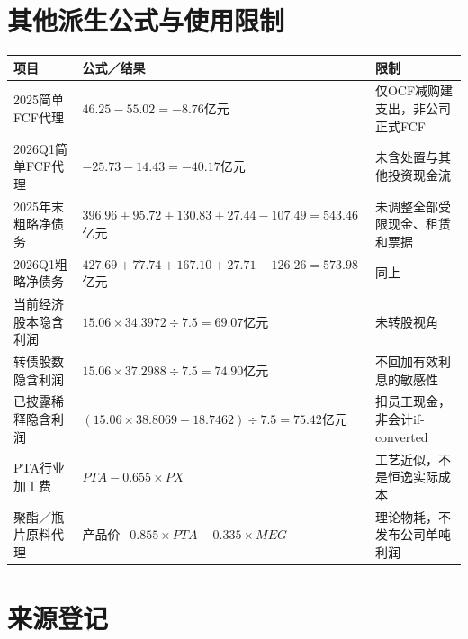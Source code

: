 \section{其他派生公式与使用限制}

\begin{exhibitbox}[财务与市场派生]
\small
\noindent\begin{tabularx}{\textwidth}{L{3.4cm}L{5.1cm}X}
\toprule
\textbf{项目} & \textbf{公式／结果} & \textbf{限制} \\
\midrule
2025简单FCF代理 & $46.25-55.02=-8.76$亿元 & 仅OCF减购建支出，非公司正式FCF \\
2026Q1简单FCF代理 & $-25.73-14.43=-40.17$亿元 & 未含处置与其他投资现金流 \\
2025年末粗略净债务 & $396.96+95.72+130.83+27.44-107.49=543.46$亿元 & 未调整全部受限现金、租赁和票据 \\
2026Q1粗略净债务 & $427.69+77.74+167.10+27.71-126.26=573.98$亿元 & 同上 \\
当前经济股本隐含利润 & $15.06\times34.3972\div7.5=69.07$亿元 & 未转股视角 \\
转债股数隐含利润 & $15.06\times37.2988\div7.5=74.90$亿元 & 不回加有效利息的敏感性 \\
已披露稀释隐含利润 & $(15.06\times38.8069-18.7462)\div7.5=75.42$亿元 & 扣员工现金，非会计if-converted \\
PTA行业加工费 & $PTA-0.655\times PX$ & 工艺近似，不是恒逸实际成本 \\
聚酯／瓶片原料代理 & 产品价$-0.855\times PTA-0.335\times MEG$ & 理论物耗，不发布公司单吨利润 \\
\bottomrule
\end{tabularx}
\end{exhibitbox}

\section{来源登记}

